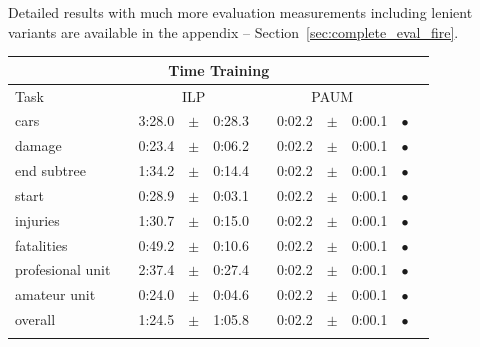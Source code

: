 Detailed results with much more evaluation measurements including lenient variants are available in the appendix -- Section~\ref{sec:complete_eval_fire}.



\begin{table}
\centering 
\begin{tabular}
{lcrclcrcl@{\hspace{0.1cm}}cc}

\multicolumn{11}{c}{Time Training}\\
\hline
Task && \multicolumn{3}{c}{ILP}  && \multicolumn{3}{c}{PAUM} && \\
\hline
              cars &&     3:28.0 &  $\pm$  &      0:28.3 & &     0:02.2 &  $\pm$  &      0:00.1 & $\bullet$ \\
            damage &&     0:23.4 &  $\pm$  &      0:06.2 & &     0:02.2 &  $\pm$  &      0:00.1 & $\bullet$ \\
       end subtree &&     1:34.2 &  $\pm$  &      0:14.4 & &     0:02.2 &  $\pm$  &      0:00.1 & $\bullet$ \\
             start &&     0:28.9 &  $\pm$  &      0:03.1 & &     0:02.2 &  $\pm$  &      0:00.1 & $\bullet$ \\
          injuries &&     1:30.7 &  $\pm$  &      0:15.0 & &     0:02.2 &  $\pm$  &      0:00.1 & $\bullet$ \\
        fatalities &&     0:49.2 &  $\pm$  &      0:10.6 & &     0:02.2 &  $\pm$  &      0:00.1 & $\bullet$ \\
  profesional unit &&     2:37.4 &  $\pm$  &      0:27.4 & &     0:02.2 &  $\pm$  &      0:00.1 & $\bullet$ \\
      amateur unit &&     0:24.0 &  $\pm$  &      0:04.6 & &     0:02.2 &  $\pm$  &      0:00.1 & $\bullet$ \\
\hline
           overall &&     1:24.5 &  $\pm$  &      1:05.8 & &     0:02.2 &  $\pm$  &      0:00.1 & $\bullet$ \\
\hline
\\


\end{tabular}
\end{table}
